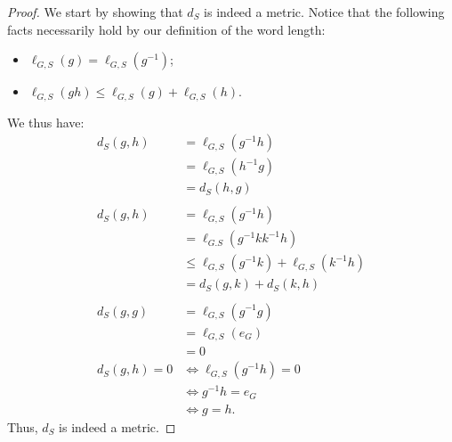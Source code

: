 \begin{proof}
  We start by showing that $d_S$ is indeed a metric. Notice that the following facts necessarily hold by our definition of the word length:
  \begin{itemize}
    \item $\ell_{G,S}\left(g\right) = \ell_{G,S}\left(g^{-1}\right)$;
    \item $\ell_{G,S}\left(gh\right) \leq \ell_{G,S}\left(g\right) + \ell_{G,S}\left(h\right)$.
  \end{itemize}
  We thus have:
  \begin{align*}
    d_{S}\left(g,h\right) &= \ell_{G,S}\left(g^{-1}h\right)\\
                          &= \ell_{G,S}\left(h^{-1}g\right)\\
                          &= d_S\left(h,g\right)\\
                          \\
    d_{S}\left(g,h\right) &= \ell_{G,S}\left(g^{-1}h\right)\\
                          &= \ell_{G.S}\left(g^{-1}kk^{-1}h\right)\\
                          &\leq \ell_{G,S}\left(g^{-1}k\right) + \ell_{G,S}\left(k^{-1}h\right)\\
                          &= d_{S}\left(g,k\right) + d_{S}\left(k,h\right)\\
                          \\
    d_{S}\left(g,g\right) &= \ell_{G,S}\left(g^{-1}g\right)\\
                          &= \ell_{G,S}\left(e_G\right)\\
                          &= 0\\
    d_{S}\left(g,h\right) = 0 &\Leftrightarrow \ell_{G,S}\left(g^{-1}h\right) = 0\\
                              &\Leftrightarrow g^{-1}h = e_{G}\\
                              &\Leftrightarrow g = h.
  \end{align*}
  Thus, $d_S$ is indeed a metric.\newline


\end{proof}
